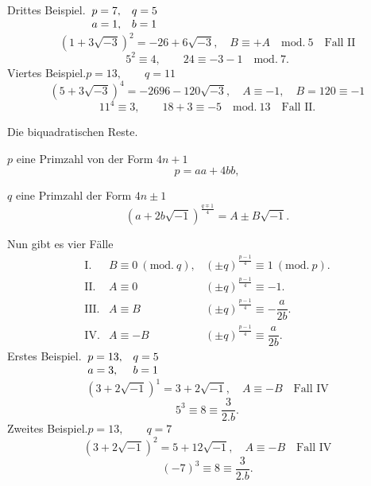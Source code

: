 \noindent{}\hspace*{\parindent}Drittes Beispiel.\qquad $\begin{array}[t]{ll}p=7,&q=5\\a=1,&b=1\end{array}$
\[(1+3\sqrt{-3})^2=-26+6\sqrt{-3},\quad B\equiv+A\quad\mathrm{mod.}\ 5\quad\text{Fall II}\]
\[5^2\equiv4,\qquad24\equiv-3-1\quad\mathrm{mod.}\ 7.\]
\noindent\hspace*{\parindent}Viertes Beispiel.\qquad $p=13,\qquad q=11$
\[(5+3\sqrt{-3})^4=-2696-120\sqrt{-3},\quad A\equiv-1,\quad B=120\equiv-1\]
\[11^4\equiv3,\qquad18+3\equiv-5\quad\mathrm{mod.}\ 13\quad\text{Fall II.}\]
\begin{center}Die biquadratischen Reste.\end{center}
\noindent\hspace*{\parindent}$p$ eine Primzahl von der Form $4n+1$
\[p=aa+4bb,\]
\par\noindent\hspace*{\parindent}$q$ eine Primzahl der Form $4n\pm1$
\[(a+2b\sqrt{-1})^{\frac{q\mp1}{4}}=A\pm B\sqrt{-1}.\]
\par\noindent\hspace*{\parindent}Nun gibt es vier Fälle
\[\begin{array}{rll}
\text{I.}&B\equiv0\ (\mathrm{mod.}\ q),&(\pm q)^{\frac{p-1}{4}}\equiv1\ (\mathrm{mod.}\ p).\\[4pt]
\text{II.}&A\equiv0&(\pm q)^{\frac{p-1}{4}}\equiv-1.\\[4pt]
\text{III.}&A\equiv B&(\pm q)^{\frac{p-1}{4}}\equiv-\dfrac{a}{2b}.\\[8pt]
\text{IV.}&A\equiv-B&(\pm q)^{\frac{p-1}{4}}\equiv\dfrac{a}{2b}.
\end{array}\]
\noindent\hspace*{\parindent}Erstes Beispiel.\qquad $\begin{array}[t]{ll}p=13,&q=5\\a=3,&b=1\end{array}$
\[(3+2\sqrt{-1})^1=3+2\sqrt{-1},\quad A\equiv-B\quad\text{Fall IV}\]
\[5^3\equiv8\equiv\dfrac{3}{2.b}.\]
\noindent\hspace*{\parindent}Zweites Beispiel.\qquad $p=13,\qquad q=7$
\[(3+2\sqrt{-1})^2=5+12\sqrt{-1},\quad A\equiv-B\quad\text{Fall IV}\]
\[(-7)^3\equiv8\equiv\dfrac{3}{2.b}.\]
